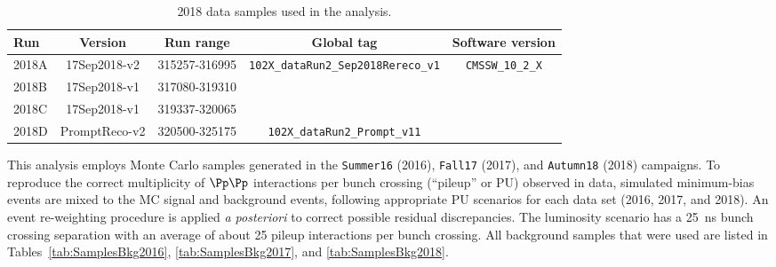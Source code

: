 \begin{table}[h]
  \begin{center}
    \caption{\label{tab:dataSamples2018} 2018 data samples used in the analysis.}
      \begin{tabular}{|l|c|c|c|c|}
      \hline
      Run   & Version       & Run range
      & Global tag & Software version \\
      \hline\hline
      2018A & 17Sep2018-v2  & 315257-316995 &
      \multirow{3}{*}{\texttt{\scriptsize 102X\_dataRun2\_Sep2018Rereco\_v1}} &
      \multirow{4}{*}{\texttt{\small CMSSW\_10\_2\_X}} \\
      2018B & 17Sep2018-v1  & 317080-319310 & &   \\
      2018C & 17Sep2018-v1  & 319337-320065 & &   \\
      \cline{4-4}
      2018D & PromptReco-v2 & 320500-325175 &
      \texttt{\small 102X\_dataRun2\_Prompt\_v11}    &   \\
      \hline
    \end{tabular}    
  \end{center}
\end{table}

This analysis employs Monte Carlo samples generated in the
\texttt{Summer16} (2016), \texttt{Fall17} (2017), and
\texttt{Autumn18} (2018) campaigns.
To reproduce the correct multiplicity of $\Pp\Pp$ interactions per
bunch crossing (``pileup'' or PU) observed in data,
simulated minimum-bias events are mixed to the MC signal and
background events, following appropriate PU scenarios for each data
set (2016, 2017, and 2018).
An event re-weighting procedure is applied \textit{a posteriori} to
correct possible residual discrepancies.
The luminosity scenario has a 25~ns bunch crossing separation with an
average of about 25 pileup interactions per bunch crossing. All
background samples that were used are listed in
Tables~\ref{tab:SamplesBkg2016}, \ref{tab:SamplesBkg2017}, and
\ref{tab:SamplesBkg2018}.

